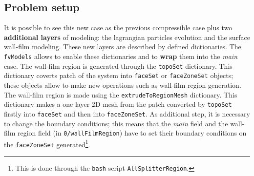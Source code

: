 %    

    \subsection{Problem setup}
    It is possible to see this new case as the previous compressible case plus two \textbf{additional layers} of modeling: the lagrangian particles evolution and the surface wall-film modeling. 
    These new layers are described by defined dictionaries. The \verb|fvModels| allows to enable these dictionaries and to \textbf{wrap} them into the \textit{main} case. The wall-film region is generated through the \verb|topoSet| dictionary. This dictionary coverts patch of the system into \verb|faceSet| or \verb|faceZoneSet| objects; these objects allow to make new operations such as wall-film region generation. The wall-film region is made using the \verb|extrudeToRegionMesh| dictionary. This dictionary makes a one layer 2D mesh from the patch converted by \verb|topoSet| firstly into \verb|faceSet| and then into \verb|faceZoneSet|. As additional step, it is necessary to change the boundary conditions; this means that the \textit{main} field and the wall-film region field (in \verb|0/wallFilmRegion|) have to set their boundary conditions on the \verb|faceZoneSet| generated\cprotect\footnote{This is done through the \verb|bash| script \verb|AllSplitterRegion|.}. 

